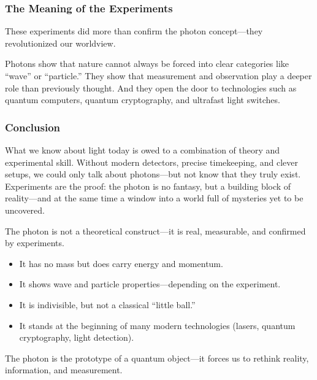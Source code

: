 \subsubsection{The Meaning of the Experiments}
\label{box:experimente}
\begin{tcolorbox}[didaktikbox, title=What the Experiments Teach Us]
	These experiments did more than confirm the photon concept—they revolutionized our worldview.
	
	Photons show that nature cannot always be forced into clear categories like “wave” or “particle.” They show that measurement and observation play a deeper role than previously thought. And they open the door to technologies such as quantum computers, quantum cryptography, and ultrafast light switches.
\end{tcolorbox}

\subsubsection{Conclusion}

What we know about light today is owed to a combination of theory and experimental skill. Without modern detectors, precise timekeeping, and clever setups, we could only talk about photons—but not know that they truly exist. Experiments are the proof: the photon is no fantasy, but a building block of reality—and at the same time a window into a world full of mysteries yet to be uncovered.

\begin{tcolorbox}[didaktikbox, title=What We Take Away from Chapter I]
	\label{box:kapitel1faz}
	The photon is not a theoretical construct—it is real, measurable, and confirmed by experiments.
	
	\begin{itemize}
		\item It has no mass but does carry energy and momentum.
		\item It shows wave and particle properties—depending on the experiment.
		\item It is indivisible, but not a classical “little ball.”
		\item It stands at the beginning of many modern technologies (lasers, quantum cryptography, light detection).
	\end{itemize}
	
	The photon is the prototype of a quantum object—it forces us to rethink reality, information, and measurement.
\end{tcolorbox}

